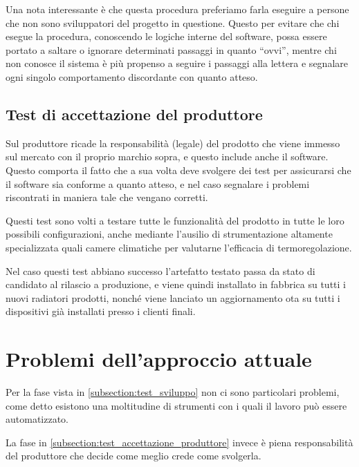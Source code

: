 \documentclass[12pt,a4paper,twoside,titlepage]{book}
\begin{document}
Una nota interessante è che questa procedura preferiamo farla eseguire a persone che non sono 
sviluppatori del progetto in questione. Questo per evitare che chi esegue la procedura, conoscendo
le logiche interne del software, possa essere portato a saltare o ignorare determinati
passaggi in quanto ``ovvi'', mentre chi non conosce il sistema è più propenso a seguire
i passaggi alla lettera e segnalare ogni singolo comportamento discordante con quanto
atteso.

\subsection{Test di accettazione del produttore}
\label{subsection:test_accettazione_produttore}

Sul \gls{produttore} ricade la responsabilità (legale) del prodotto
che viene immesso sul mercato con il proprio marchio sopra, e questo include anche
il software. Questo comporta il fatto che a sua volta deve svolgere dei test per
assicurarsi che il software sia conforme a quanto atteso, e nel caso segnalare i
problemi riscontrati in maniera tale che vengano corretti.

Questi test sono volti a testare tutte le funzionalità del prodotto in tutte le loro
possibili configurazioni, anche mediante l'ausilio di strumentazione altamente
specializzata quali camere climatiche per valutarne l'efficacia di termoregolazione.

Nel caso questi test abbiano successo l'artefatto testato passa da stato di candidato
al rilascio a produzione, e viene quindi installato in fabbrica su tutti i nuovi radiatori
prodotti, nonché viene lanciato un aggiornamento \acrshort{ota} su tutti i dispositivi già installati
presso i clienti finali.

\section{Problemi dell'approccio attuale}

Per la fase vista in \autoref{subsection:test_sviluppo} non ci sono particolari problemi,
come detto esistono una moltitudine di strumenti con i quali il lavoro può essere automatizzato. 

La fase in \autoref{subsection:test_accettazione_produttore} invece è piena responsabilità del 
\gls{produttore} che decide come meglio crede come svolgerla. 
\end{document}
